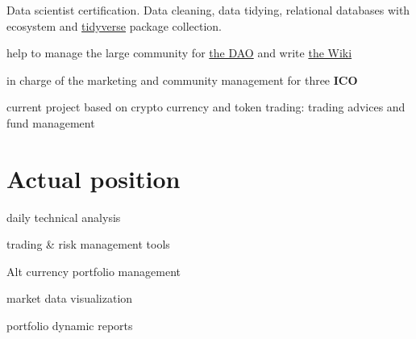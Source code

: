 Data scientist certification. Data cleaning, data tidying, relational databases with \Rlogo{} ecosystem and \href{https://www.tidyverse.org/}{tidyverse} package collection.

\vspace{\baselineskip}
\vspace{-0.5cm}

\begin{itemize}
  {
     \item[\faCaretRight] help to manage the large community for \href{https://en.wikipedia.org/wiki/The_DAO_(organization)}{the DAO} and write \href{https://daowiki.atlassian.net/wiki/spaces/DAO/pages/16744450/How-To+withdraw+funds+from+the+withdrawal+contract}{the Wiki}
     \item[\faCaretRight] in charge of the marketing and community management for three \textbf{ICO}
     \item[\faCaretRight] current project based on crypto currency and token trading: trading advices and fund management
   }
\end{itemize}



\section{Actual position}

\vspace{\baselineskip}

\begin{itemize}
\begin{multicols}{2}
  {
     \item[\faCaretRight] daily technical analysis
     \item[\faCaretRight] trading \& risk management tools
     \item[\faCaretRight] Alt currency portfolio management
     \item[\faCaretRight] market data visualization
     \item[\faCaretRight] portfolio dynamic reports
   }
\end{multicols}
\end{itemize}


